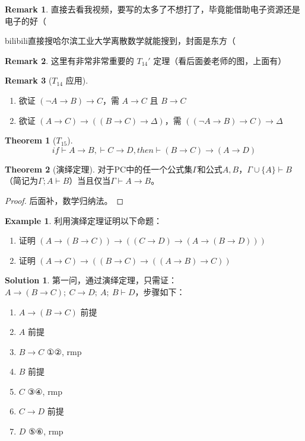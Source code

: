 \documentclass[oneside]{book}
\theoremstyle{definition}
\newtheorem{example}{Example}[section]
\newtheorem{theorem}{Theorem}[section]
\newtheorem{remark}{Remark}[section]
\newtheorem*{sol}{Solution}
\begin{document}
\begin{remark}
	直接去看我视频，要写的太多了不想打了，毕竟能借助电子资源还是电子的好（
\end{remark}
bilibili直接搜哈尔滨工业大学离散数学就能搜到，封面是东方（
\begin{remark}
	这里有非常非常重要的 \(T_{14}'\) 定理（看后面姜老师的图，上面有）
\end{remark}
\begin{remark}[\( T_{14} \) 应用]
	\begin{enumerate}
		\item 欲证 \( (\neg A \to B) \to C \)，需 \( A \to C \) 且 \( B \to C \)
		\item 欲证 \( (A \to C) \to ((B \to C) \to \Delta) \)，需 \( ((\neg A \to B) \to C) \to \Delta \)
	\end{enumerate}
\end{remark}


\begin{theorem}[\(T_{15}\)]
	\[
	if \vdash A \to B,\vdash C \to D,then\vdash (B \to C) \to (A \to D)
	\]
\end{theorem}

\begin{theorem}[演绎定理]
	对于PC中的任一个公式集$\Gamma$和公式$A,B$，$\Gamma \cup \{A\} \vdash B$（简记为$\Gamma;A \vdash B$）当且仅当$\Gamma \vdash A \to B$。
\end{theorem}
\begin{proof}
	后面补，数学归纳法。
\end{proof}

\begin{example}
	利用演绎定理证明以下命题：
	\begin{enumerate}
		\item 证明 \( (A \to (B \to C)) \to ((C \to D) \to (A \to (B \to D))) \)
		\item 证明 \( (A \to C) \to ((B \to C) \to ((A \to B) \to C)) \)
	\end{enumerate}
\end{example}
\begin{sol}
	第一问，通过演绎定理，只需证：\( A \to (B \to C);\ C \to D;\ A;\ B \vdash D \)，步骤如下：
	\begin{enumerate}
		\item \( A \to (B \to C) \) \hfill 前提
		\item \( A \) \hfill 前提
		\item \( B \to C \) \hfill ①②, rmp
		\item \( B \) \hfill 前提
		\item \( C \) \hfill ③④, rmp
		\item \( C \to D \) \hfill 前提
		\item \( D \) \hfill ⑤⑥, rmp
	\end{enumerate}
\end{sol}
\end{document}
